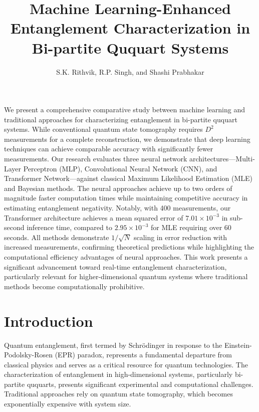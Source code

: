 \documentclass{optica-article}
\begin{document}
\title{Machine Learning-Enhanced Entanglement Characterization in Bi-partite Ququart Systems}

\author{S.K. Rithvik, R.P. Singh, and Shashi Prabhakar}

\address{Atomic, Molecular and Optical Physics Division, Physical Research Laboratory, Navrangpura, Ahmedabad 380009, India\\
Indian Institute of Technology Gandhinagar, Palaj, Gandhinagar 382355, India\\
}


\begin{abstract*} 
We present a comprehensive comparative study between machine learning and traditional approaches for characterizing entanglement in bi-partite ququart systems. While conventional quantum state tomography requires $D^2$ measurements for a complete reconstruction, we demonstrate that deep learning techniques can achieve comparable accuracy with significantly fewer measurements. Our research evaluates three neural network architectures—Multi-Layer Perceptron (MLP), Convolutional Neural Network (CNN), and Transformer Network—against classical Maximum Likelihood Estimation (MLE) and Bayesian methods. The neural approaches achieve up to two orders of magnitude faster computation times while maintaining competitive accuracy in estimating entanglement negativity. Notably, with 400 measurements, our Transformer architecture achieves a mean squared error of $7.01 \times 10^{-3}$ in sub-second inference time, compared to $2.95 \times 10^{-3}$ for MLE requiring over 60 seconds. All methods demonstrate $1/\sqrt{N}$ scaling in error reduction with increased measurements, confirming theoretical predictions while highlighting the computational efficiency advantages of neural approaches. This work presents a significant advancement toward real-time entanglement characterization, particularly relevant for higher-dimensional quantum systems where traditional methods become computationally prohibitive.
\end{abstract*}

\section{Introduction}

Quantum entanglement, first termed by Schrödinger\cite{Schrödinger_1935} in response to the Einstein-Podolsky-Rosen (EPR) paradox\cite{PhysRev.47.777}, represents a fundamental departure from classical physics and serves as a critical resource for quantum technologies. The characterization of entanglement in high-dimensional systems, particularly bi-partite ququarts, presents significant experimental and computational challenges\cite{RevModPhys.81.865}. Traditional approaches rely on quantum state tomography, which becomes exponentially expensive with system size\cite{Torlai2018}.
\end{document}
